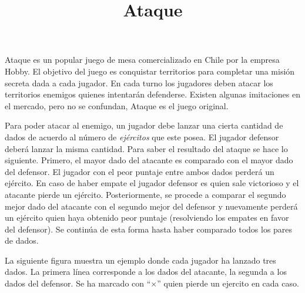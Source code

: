 \documentclass{oci}
\title{Ataque}
\newcommand{\pierde}{$\times$}
\begin{document}
\begin{problemDescription}
  Ataque es un popular juego de mesa comercializado en Chile por la empresa Hobby.
  El objetivo del juego es conquistar territorios para completar una misión
  secreta dada a cada jugador.
  En cada turno los jugadores deben atacar los territorios enemigos quienes
  intentarán defenderse.
  Existen algunas imitaciones en el mercado, pero no se confundan, Ataque es el
  juego original.

  Para poder atacar al enemigo, un jugador debe lanzar una cierta cantidad de
  dados de acuerdo al número de \emph{ejércitos} que este posea.
  El jugador defensor deberá lanzar la misma cantidad.
  Para saber el resultado del ataque se hace lo siguiente.
  Primero, el mayor dado del atacante es comparado con el mayor dado del defensor.
  El jugador con el peor puntaje entre ambos dados perderá un ejército.
  En caso de haber empate el jugador defensor es quien sale victorioso y el
  atacante pierde un ejército.
  Posteriormente, se procede a comparar el segundo mejor dado del atacante con
  el segundo mejor del defensor y nuevamente perderá un ejército quien haya
  obtenido peor puntaje (resolviendo los empates en favor del defensor).
  Se continúa de esta forma hasta haber comparado todos los pares de dados.
  
  La siguiente figura muestra un ejemplo donde cada jugador ha lanzado tres
  dados. La primera línea corresponde a los dados del atacante, la segunda a los dados del defensor.
  Se ha marcado con ``\pierde'' quien pierde un ejercito en cada caso.
  \begin{center}
\end{center}
\end{problemDescription}
\end{document}
